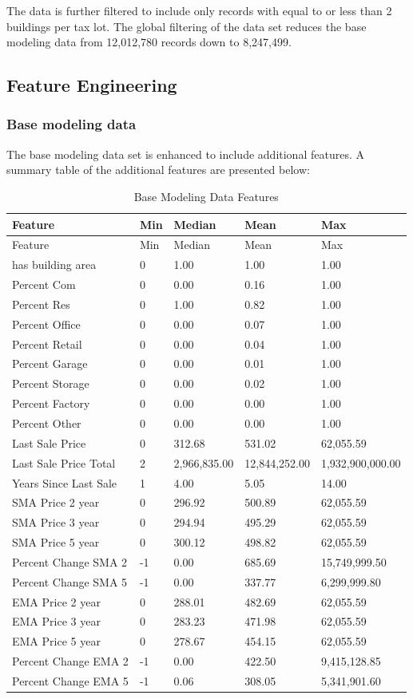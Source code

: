 \documentclass[]{article}
\begin{document}
The data is further filtered to include only records with equal to or
less than 2 buildings per tax lot. The global filtering of the data set
reduces the base modeling data from 12,012,780 records down to
8,247,499.

\subsection{Feature Engineering}\label{feature-engineering}

\subsubsection{Base modeling data}\label{base-modeling-data}

The base modeling data set is enhanced to include additional features. A
summary table of the additional features are presented below:

\begin{longtable}[]{@{}lllll@{}}
\caption{Base Modeling Data Features}\tabularnewline
\toprule
Feature & Min & Median & Mean & Max\tabularnewline
\midrule
\endfirsthead
\toprule
Feature & Min & Median & Mean & Max\tabularnewline
\midrule
\endhead
has building area & 0 & 1.00 & 1.00 & 1.00\tabularnewline
Percent Com & 0 & 0.00 & 0.16 & 1.00\tabularnewline
Percent Res & 0 & 1.00 & 0.82 & 1.00\tabularnewline
Percent Office & 0 & 0.00 & 0.07 & 1.00\tabularnewline
Percent Retail & 0 & 0.00 & 0.04 & 1.00\tabularnewline
Percent Garage & 0 & 0.00 & 0.01 & 1.00\tabularnewline
Percent Storage & 0 & 0.00 & 0.02 & 1.00\tabularnewline
Percent Factory & 0 & 0.00 & 0.00 & 1.00\tabularnewline
Percent Other & 0 & 0.00 & 0.00 & 1.00\tabularnewline
Last Sale Price & 0 & 312.68 & 531.02 & 62,055.59\tabularnewline
Last Sale Price Total & 2 & 2,966,835.00 & 12,844,252.00 &
1,932,900,000.00\tabularnewline
Years Since Last Sale & 1 & 4.00 & 5.05 & 14.00\tabularnewline
SMA Price 2 year & 0 & 296.92 & 500.89 & 62,055.59\tabularnewline
SMA Price 3 year & 0 & 294.94 & 495.29 & 62,055.59\tabularnewline
SMA Price 5 year & 0 & 300.12 & 498.82 & 62,055.59\tabularnewline
Percent Change SMA 2 & -1 & 0.00 & 685.69 & 15,749,999.50\tabularnewline
Percent Change SMA 5 & -1 & 0.00 & 337.77 & 6,299,999.80\tabularnewline
EMA Price 2 year & 0 & 288.01 & 482.69 & 62,055.59\tabularnewline
EMA Price 3 year & 0 & 283.23 & 471.98 & 62,055.59\tabularnewline
EMA Price 5 year & 0 & 278.67 & 454.15 & 62,055.59\tabularnewline
Percent Change EMA 2 & -1 & 0.00 & 422.50 & 9,415,128.85\tabularnewline
Percent Change EMA 5 & -1 & 0.06 & 308.05 & 5,341,901.60\tabularnewline
\bottomrule
\end{longtable}
\end{document}
